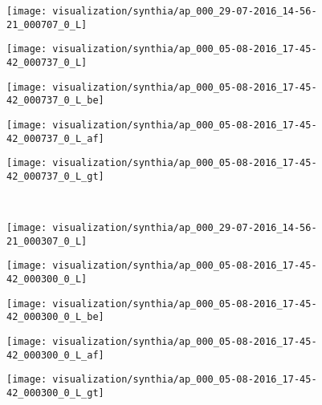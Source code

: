 \documentclass[10pt,twocolumn,letterpaper]{article}
\begin{document}
\begin{figure*}[t!]
	\centering
	\begin{subfigure}[t]{0.196\linewidth}
		\centering
		\texttt{[image: visualization/synthia/ap\_000\_29-07-2016\_14-56-21\_000707\_0\_L]}
	\end{subfigure}
	\hfill
	\begin{subfigure}[t]{0.196\linewidth}
		\centering
		\texttt{[image: visualization/synthia/ap\_000\_05-08-2016\_17-45-42\_000737\_0\_L]}
	\end{subfigure}
	\hfill
	\begin{subfigure}[t]{0.196\linewidth}
		\centering
		\texttt{[image: visualization/synthia/ap\_000\_05-08-2016\_17-45-42\_000737\_0\_L\_be]}
	\end{subfigure}
	\hfill
	\begin{subfigure}[t]{0.196\linewidth}
		\centering
		\texttt{[image: visualization/synthia/ap\_000\_05-08-2016\_17-45-42\_000737\_0\_L\_af]}
	\end{subfigure}
	\hfill
	\begin{subfigure}[t]{0.196\linewidth}
		\centering
		\texttt{[image: visualization/synthia/ap\_000\_05-08-2016\_17-45-42\_000737\_0\_L\_gt]}
	\end{subfigure}
	\hfill
	\\
	\centering
	\begin{subfigure}[t]{0.196\linewidth}
		\centering
		\texttt{[image: visualization/synthia/ap\_000\_29-07-2016\_14-56-21\_000307\_0\_L]}
	\end{subfigure}
	\hfill
	\begin{subfigure}[t]{0.196\linewidth}
		\centering
		\texttt{[image: visualization/synthia/ap\_000\_05-08-2016\_17-45-42\_000300\_0\_L]}
	\end{subfigure}
	\hfill
	\begin{subfigure}[t]{0.196\linewidth}
		\centering
		\texttt{[image: visualization/synthia/ap\_000\_05-08-2016\_17-45-42\_000300\_0\_L\_be]}
	\end{subfigure}
	\hfill
	\begin{subfigure}[t]{0.196\linewidth}
		\centering
		\texttt{[image: visualization/synthia/ap\_000\_05-08-2016\_17-45-42\_000300\_0\_L\_af]}
	\end{subfigure}
	\hfill
	\begin{subfigure}[t]{0.196\linewidth}
		\centering
		\texttt{[image: visualization/synthia/ap\_000\_05-08-2016\_17-45-42\_000300\_0\_L\_gt]}

\end{subfigure}
\end{figure*}
\end{document}
